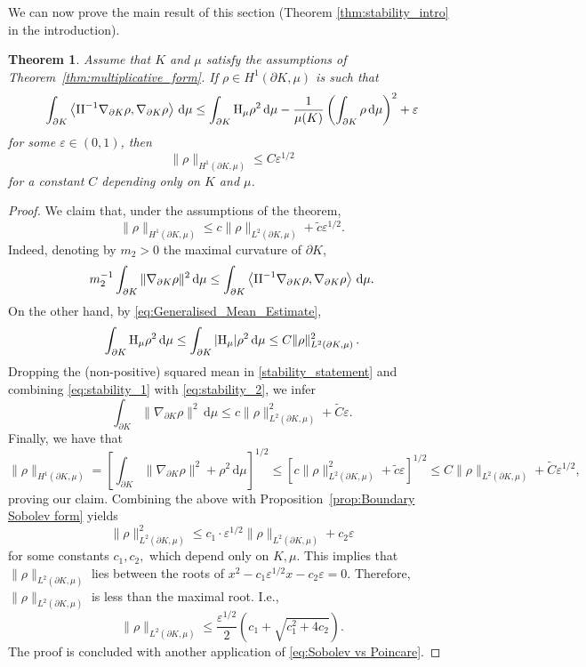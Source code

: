 \documentclass[a4paper, 11pt]{article}
\newtheorem{theorem}{Theorem}[section]
\theoremstyle{definition}
\newcommand{\di}{\, \mathrm{d}}
\begin{document}
We can now prove the main result of this section (Theorem \ref{thm:stability_intro} in the introduction). 
\begin{theorem}\label{thm:Colesanti_Stability}
Assume that $K$ and $\mu$ satisfy the assumptions of Theorem~\ref{thm:multiplicative_form}. If $\rho \in H^1(\partial K,\mu)$ is such that 
\begin{equation}\label{stability_statement}
\int_{\partial K} \left\langle {\rm{II}}^{-1}\nabla_{\partial K}\rho, \nabla_{\partial K} \rho \right\rangle \di \mu \leq \int_{\partial K}\mathrm{H}_{\mu}\rho^2\di \mu  -\frac{1}{\mu(K)}\left( \int_{\partial K}\rho \di \mu  \right)^2 + \varepsilon 
\end{equation}
for some $\varepsilon \in (0,1)$, then
\[\|\rho\|_{H^{1}(\partial K,\mu)} \leq C\varepsilon^{1/2}\]
for a constant $C$ depending only on $K$ and $\mu$.
\end{theorem}
\begin{proof} We claim that, under the assumptions of the theorem,
\begin{equation}\label{eq:Sobolev vs Poincare}
\|\rho\|_{H^{1}(\partial K,\mu)} \leq c\|\rho\|_{L^2(\partial K, \mu)}+\tilde{c}\varepsilon^{1/2}.
\end{equation} 
Indeed, denoting by $m_{2} >0$ the maximal curvature of $\partial K$,
 \begin{equation}\label{eq:stability_1}
        m_{2}^{-1}\int_{\partial K} \|\nabla_{\partial K} \rho \|^2 \di \mu 
        \leq \int_{\partial K} \left\langle {\rm{II}}^{-1} \nabla_{\partial K } \rho, \nabla_{\partial K } \rho \right\rangle \di \mu.
    \end{equation}
On the other hand, by \eqref{eq:Generalised_Mean_Estimate},
\begin{equation}\label{eq:stability_2}
    \int_{\partial K} {\rm H}_\mu \rho^2 \di \mu \leq \int_{\partial K} |{\rm H}_\mu| \rho^2 \di \mu \leq C\|\rho\|^2_{L^2(\partial K, \mu)} \, .
\end{equation}
Dropping the (non-positive) squared mean in \eqref{stability_statement} and combining \eqref{eq:stability_1} with \eqref{eq:stability_2}, we infer
\[\int_{\partial K} \|\nabla_{\partial K} \rho \|^2 \di \mu 
        \leq c\|\rho\|^2_{L^2(\partial K, \mu)}+ \tilde{C}\varepsilon. \]
Finally, we have that
\[\|\rho\|_{H^{1}(\partial K,\mu)} = \left[ \int_{\partial K} \|\nabla_{\partial K} \rho \|^2+\rho^2\di \mu \right]^{1/2} \leq \left[c\|\rho\|^2_{L^2(\partial K, \mu)} +\tilde{c}\varepsilon \right]^{1/2} \leq 
C\|\rho\|_{L^2(\partial K, \mu)} + \tilde{C}\varepsilon^{1/2},\]
proving our claim. Combining the above with Proposition~\ref{prop:Boundary Sobolev form} yields
\[\|\rho\|^{2}_{L^2(\partial K, \mu)} \leq c_{1} \cdot \varepsilon^{1/2}\|\rho\|_{L^2(\partial K, \mu)}+c_{2} \varepsilon \]
for some constants $c_{1},c_{2},$ which depend only on $K,\mu$. This implies that $\|\rho\|_{L^2(\partial K, \mu)}$ lies between the roots of $x^2-c_{1}\varepsilon^{1/2}x-c_{2}\varepsilon=0$. Therefore, $\|\rho\|_{L^2(\partial K, \mu)}$ is less than the maximal root. I.e.,
\[\|\rho\|_{L^2(\partial K, \mu)} \leq \frac{\varepsilon^{1/2}}{2}\left(c_{1}+\sqrt{c^2_{1}+4c_{2}}\right).  \]
The proof is concluded with another application of \eqref{eq:Sobolev vs Poincare}.
\end{proof}
\end{document}
